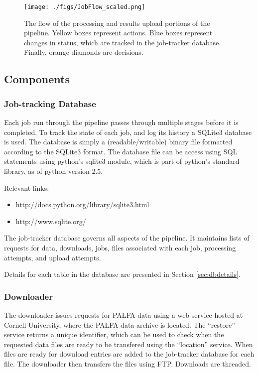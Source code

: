 \documentclass[12pt]{article}
\begin{document}
\begin{figure}
    \centering
    \texttt{[image: ./figs/JobFlow\_scaled.png]}
    \caption{The flow of the processing and results upload portions of the pipeline. Yellow boxes represent actions. Blue boxes represent changes in status, which are tracked in the job-tracker database. Finally, orange diamonds are decisions. \label{fig:job flow}}
\end{figure}


\subsection{Components}
\subsubsection{Job-tracking Database}
Each job run through the pipeline passes through multiple stages before it is completed. To track the state of each job, and log its history a SQLite3 database is used. The database is simply a (readable/writable) binary file formatted according to the SQLite3 format. The database file can be access using SQL statements using python's sqlite3 module, which is part of python's standard library, as of python version 2.5.

Relevant links:
\begin{itemize}
    \item http://docs.python.org/library/sqlite3.html
    \item http://www.sqlite.org/
\end{itemize}

The job-tracker database governs all aspects of the pipeline. It maintains lists of requests for data, downloads, jobs, files associated with each job, processing attempts, and upload attempts.

Details for each table in the database are presented in Section \ref{sec:dbdetails}.

\subsubsection{Downloader}
The downloader issues requests for PALFA data using a web service hosted at Cornell University, where the PALFA data archive is located. The ``restore'' service returns a unique identifier, which can be used to check when the requested data files are ready to be transfered using the ``location'' service. When files are ready for download entries are added to the job-tracker database for each file. The downloader then transfers the files using FTP. Downloads are threaded.
\end{document}
